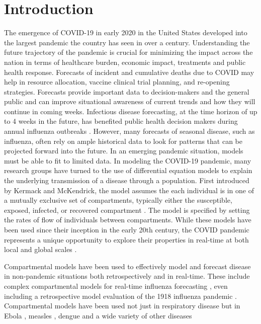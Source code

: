 \documentclass[11pt]{amsart}
\begin{document}

\section{Introduction}

The emergence of COVID-19 in early 2020 in the United States developed into the largest pandemic the country has seen in over a century. Understanding the future trajectory of the pandemic is crucial for minimizing the impact across the nation in terms of healthcare burden, economic impact, treatments and public health response. Forecasts of incident and cumulative deaths due to COVID may help in resource allocation, vaccine clinical trial planning, and re-opening strategies. Forecasts provide important data to decision-makers and the general public and can improve situational awareness of current trends and how they will continue in coming weeks. Infectious disease forecasting, at the time horizon of up to 4 weeks in the future, has benefited public health decision makers during annual influenza outbreaks \cite{lutz2019applying}\cite{myers2000forecasting}.  However, many forecasts of seasonal disease, such as influenza, often rely on ample historical data to look for patterns that can be projected forward into the future. In an emerging pandemic situation, models must be able to fit to limited data. In modeling the COVID-19 pandemic, many research groups have turned to the use of differential equation models to explain the underlying transmission of a disease through a population. First introduced by  Kermack and McKendrick, the model assumes the each individual is in one of a mutually exclusive set of compartments, typically either the susceptible, exposed, infected, or recovered compartment \cite{kermack1927contribution}. The model is specified by setting the rates of flow of individuals between compartments. While these models have been used since their inception in the early 20th century, the COVID pandemic represents a unique opportunity to explore their properties in real-time at both local and global scales .
 
Compartmental models have been used to effectively model and forecast disease in non-pandemic situations both retrospectively and in real-time. These include complex compartmental models for real-time influenza forecasting \cite{shaman2012forecasting}\cite{osthus2017forecasting}\cite{ong2010real}, even including a retrospective model evaluation of the 1918 influenza pandemic \cite{hall2007real}. Compartmental models have been used not just in respiratory disease but in Ebola \cite{lekone2006statistical}, measles \cite{bokler1993chaos}, dengue \cite{syafruddin2012seir} and a wide variety of other diseases
\end{document}
